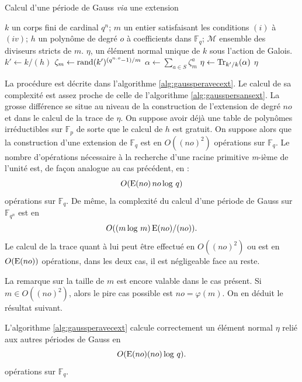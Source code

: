 \documentclass[a4paper]{article} %
\numberwithin{section}{part}
\numberwithin{equation}{section}
\newcommand\nroot[1]{\textit{#1}-ième}
\newcommand\GF[1]{\mathbb{F}_{#1}}
\newcommand\E[1]{\textup{E}(#1)}
\begin{document}
\vspace{0.3cm}
\begin{algorithm}
\caption{Calcul d'une période de Gauss \emph{via} une extension}
\label{alg:gaussperavecext}
\begin{algorithmic}[1]
\REQUIRE $k$ un corps fini de cardinal $q^n$; $m$ un entier satisfaisant les 
conditions $(i)$ à $(iv)$; $h$ un polynôme de degré $o$ à coefficients dans 
$\GF{q}$; $\mathcal{M}$ ensemble des diviseurs stricts de
$m$.
\ENSURE $\eta$, un élément normal unique de $k$ sous l'action de Galois.
\bigskip
\STATE $k' \leftarrow k/(h)$
\REPEAT
    \STATE $\zeta_m \leftarrow \textup{rand}(k')^{(q^{n.o} - 1)/m}$
\STATE $\alpha \leftarrow \sum_{a\in S}{\zeta_m^a}$
\STATE $\eta \leftarrow \textup{Tr}_{k'/k}(\alpha)$
\RETURN $\eta$
\end{algorithmic}
\end{algorithm}
La procédure est décrite dans l'algorithme \ref{alg:gaussperavecext}. Le calcul 
de sa complexité est assez proche de celle de l'algorithme 
\ref{alg:gausspersansext}. La grosse différence se situe au niveau de la 
construction de l'extension de degré $no$ et dans le calcul de la trace de 
$\eta$. On suppose avoir déjà une table de polynômes irréductibles  
sur $\GF{p}$ de sorte que le calcul de $h$ est gratuit. On suppose alors 
que la construction d'une extension de $\GF{q}$ est en $O((no)^2)$ opérations 
sur $\GF{q}$. Le nombre d'opérations nécessaire à la recherche d'une racine 
primitive \nroot{m} de l'unité est, de façon analogue au cas précédent, en :
\begin{equation}
O(\E{no}\,no\,\textup{log }q)
\end{equation}
opérations sur $\GF{q}$. De même, la complexité du calcul d'une période de Gauss
sur $\GF{q^n}$ est en 
\begin{equation}
O((m\,\textup{log }m)\,\E{no}/(no)).
\end{equation}
Le calcul de la trace quant à lui peut être effectué en $O((no)^2)$ ou est en
$O(\E{no})$ opérations, dans les deux cas, il est négligeable face au reste.\par
La remarque sur la taille de $m$ est encore valable dans le cas présent. Si
$m\in O((no)^2)$, alors le pire cas possible est $no = \varphi(m)$. On en déduit
le résultat suivant.
\begin{prop} 
\label{prop:algavecext}
L'algorithme \ref{alg:gaussperavecext} calcule correctement un élément normal
$\eta$ relié aux autres périodes de Gauss en 
\begin{equation}
O(\E{no}(no)\,\textup{log }q).
\end{equation}
opérations sur $\GF{q}$.
\end{prop}
\end{document}
